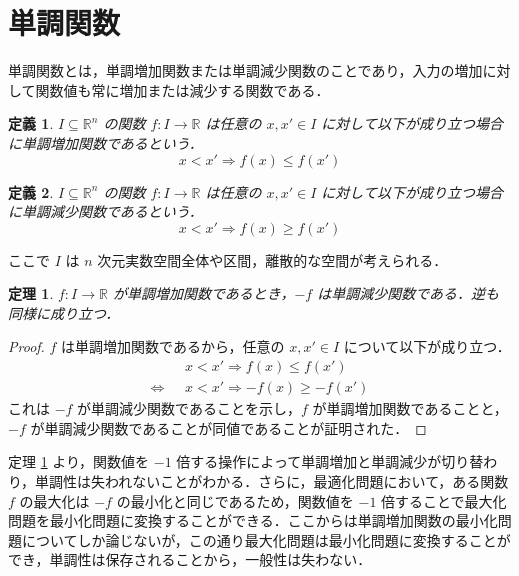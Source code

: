 \documentclass[a4paper,11pt]{jreport}
\newtheorem{definition}{定義}
\newtheorem{theorem}{定理}
\begin{document}
\section{単調関数}

単調関数とは，単調増加関数または単調減少関数のことであり，入力の増加に対して関数値も常に増加または減少する関数である．\\

\begin{definition}
$ I \subseteq \mathbb{R}^n $ の関数 $ f : I \to \mathbb{R} $ は任意の $ x, x' \in I $ に対して以下が成り立つ場合に単調増加関数であるという．
$$ x < x' \Rightarrow f(x) \leq f(x') $$
\end{definition}

\begin{definition}
$ I \subseteq \mathbb{R}^n $ の関数 $ f : I \to \mathbb{R} $ は任意の $ x, x' \in I $ に対して以下が成り立つ場合に単調減少関数であるという．
$$ x < x' \Rightarrow f(x) \geq f(x') $$
\end{definition}

ここで $ I $ は $ n $ 次元実数空間全体や区間，離散的な空間が考えられる．\\

\begin{theorem} \label{keeping_monotonicity}
$ f : I \to \mathbb{R} $ が単調増加関数であるとき，$ -f $ は単調減少関数である．逆も同様に成り立つ．
\end{theorem}

\begin{proof}
$ f $ は単調増加関数であるから，任意の $ x, x' \in I $ について以下が成り立つ．
\begin{align*}
& x < x' \Rightarrow f(x) \leq f(x') \\
\Longleftrightarrow \hspace{8pt} & x < x' \Rightarrow -f(x) \geq -f(x')
\end{align*}
これは $ -f $ が単調減少関数であることを示し，$ f $ が単調増加関数であることと，$ -f $ が単調減少関数であることが同値であることが証明された．
\end{proof}

定理 \ref{keeping_monotonicity} より，関数値を $ -1 $ 倍する操作によって単調増加と単調減少が切り替わり，単調性は失われないことがわかる．さらに，最適化問題において，ある関数 $ f $ の最大化は $ -f $ の最小化と同じであるため，関数値を $ -1 $ 倍することで最大化問題を最小化問題に変換することができる．ここからは単調増加関数の最小化問題についてしか論じないが，この通り最大化問題は最小化問題に変換することができ，単調性は保存されることから，一般性は失わない．\par
\end{document}
